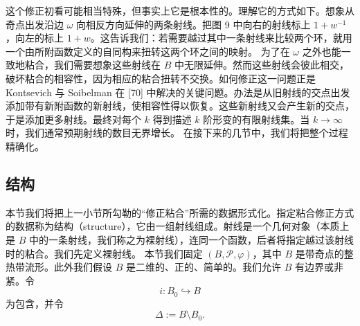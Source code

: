 这个修正初看可能相当特殊，但事实上它是根本性的。理解它的方式如下。想象从奇点出发沿边 $\omega$ 向相反方向延伸的两条射线。把图 9 中向右的射线标上 $1+w^{-1}$，向左的标上 $1+w$。这告诉我们：若需要越过其中一条射线来比较两个环，就用一个由所附函数定义的自同构来扭转这两个环之间的映射。
为了在 $\omega$ 之外也能一致地粘合，我们需要想象这些射线在 $B$ 中无限延伸。然而这些射线会彼此相交，破坏粘合的相容性，因为相应的粘合扭转不交换。如何修正这一问题正是 Kontsevich 与 Soibelman 在 [70] 中解决的关键问题。办法是从旧射线的交点出发添加带有新附函数的新射线，使相容性得以恢复。这些新射线又会产生新的交点，于是添加更多射线。最终对每个 $k$ 得到描述 $k$ 阶形变的有限射线集。当 $k\to\infty$ 时，我们通常预期射线的数目无界增长。
在接下来的几节中，我们将把整个过程精确化。

\subsection{结构}
本节我们将把上一小节所勾勒的“修正粘合”所需的数据形式化。指定粘合修正方式的数据称为结构（structure），它由一组射线组成。射线是一个几何对象（本质上是 $B$ 中的一条射线，我们称之为裸射线），连同一个函数，后者将指定越过该射线时的粘合。我们先定义裸射线。
本节我们固定 $(B,\mathcal{P},\varphi)$，其中 $B$ 是带奇点的整热带流形。此外我们假设 $B$ 是二维的、正的、简单的。我们允许 $B$ 有边界或非紧。令
\[
i:B_0\hookrightarrow B
\]
为包含，并令
\[
\Delta:=B\setminus B_0.
\]

